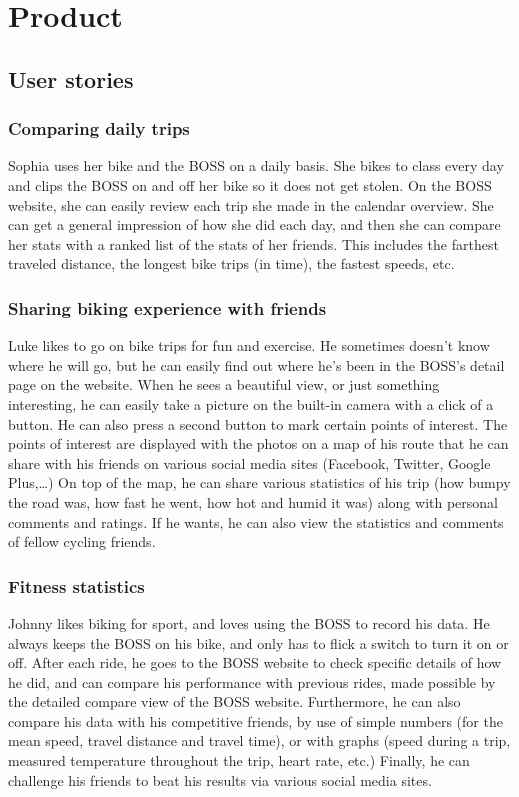 \section{Product}
\subsection{User stories}
\subsubsection{Comparing daily trips}
Sophia uses her bike and the BOSS on a daily basis. 
She bikes to class every day and clips the BOSS on and off her bike so it does not get stolen. 
On the BOSS website, she can easily review each trip she made in the calendar overview. 
She can get a general impression of how she did each day, and then she can compare her stats with a ranked list of the stats of her friends. 
This includes the farthest traveled distance, the longest bike trips (in time), the fastest speeds, etc.

\subsubsection{Sharing biking experience with friends}
Luke likes to go on bike trips for fun and exercise. 
He sometimes doesn’t know where he will go, but he can easily find out where he’s been in the BOSS’s detail page on the website. 
When he sees a beautiful view, or just something interesting, he can easily take a picture on the built-in camera with a click of a button. 
He can also press a second button to mark certain points of interest. 
The points of interest are displayed with the photos on a map of his route that he can share with his friends on various social media sites (Facebook, Twitter, Google Plus,…) On top of the map, he can share various statistics of his trip (how bumpy the road was, how fast he went, how hot and humid it was) along with personal comments and ratings. 
If he wants, he can also view the statistics and comments of fellow cycling friends. 

\subsubsection{Fitness statistics}
Johnny likes biking for sport, and loves using the BOSS to record his data. 
He always keeps the BOSS on his bike, and only has to flick a switch to turn it on or off. 
After each ride, he goes to the BOSS website to check specific details of how he did, and can compare his performance with previous rides, made possible by the detailed compare view of the BOSS website. 
Furthermore, he can also compare his data with his competitive friends, by use of simple numbers (for the mean speed, travel distance and travel time), or with graphs (speed during a trip, measured temperature throughout the trip, heart rate, etc.) Finally, he can challenge his friends to beat his results via various social media sites.

